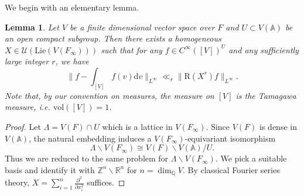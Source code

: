 \documentclass[letterpaper,11pt]{amsart}
\newcommand{\bA}{\mathbb{A}}
\newcommand{\Q}{\mathbb{Q}}
\newcommand{\R}{\mathbb{R}}
\newcommand{\Z}{\mathbb{Z}}
\newcommand{\cU}{\mathcal{U}}
\newcommand{\rd}{\mathrm{d}}
\newcommand{\<}{\negthickspace}
\theoremstyle{definition}
\theoremstyle{plain}
\newtheorem{lemma}[definition]{Lemma}
\theoremstyle{remark}
\numberwithin{equation}{section}
\begin{document}
We begin with an elementary lemma.

\begin{lemma} \label{lem:Fourier_series_estimate}
Let $V$ be a finite dimensional vector space over $F$ and $U \subset
V(\bA)$ be an open compact subgroup. Then there exists a homogeneous $X \in
\cU(\mathrm{Lie}(V(F_\infty)))$ such that for any $f \in
C^\infty([V])^U$ and any sufficiently large integer $r$, we have
    \begin{equation}    \label{eq:constant_term_approx}
    \| f - \int_{[V]} f(v) \rd v  \|_{L^\infty}
    \ll_r \| \mathrm{R}(X^r) f \|_{L^\infty}.
    \end{equation}
Note that, by our convention on measures, the measure on $[V]$ is the Tamagawa measure, i.e. $\mathrm{vol}([V])=1$.
\end{lemma}


\begin{proof}
Let $\Lambda = V(F)
\cap U$ which is a lattice in $V(F_\infty)$. Since $V(F)$ is dense in
$V(\bA)$, the natural embedding induces a $V(F_\infty)$-equivariant
isomorphism
    \[
    \Lambda \backslash V(F_\infty) \cong V(F) \backslash V(\bA) /U.
    \]
Thus we are reduced to the same problem for $\Lambda \backslash V(F_\infty)$.
We pick a suitable basis and identify it with $\Z^n \backslash \R^n$ for $n =
\dim_\Q V$. By classical Fourier series theory, $ X = \sum_{i=1}^n
\frac{\partial^2}{\partial x_i^2} $ suffices.
\end{proof}
\end{document}
